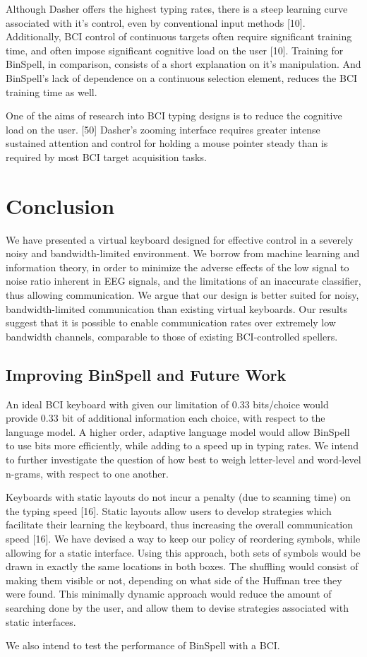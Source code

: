 \documentclass[12pt,titlepage]{article}
\begin{document}
Although Dasher offers the highest typing rates, there is a steep learning curve associated with 
it's control, even by conventional input methods [10].  Additionally, BCI control of continuous 
targets often require significant training time, and often impose significant cognitive load on 
the user [10].  Training for BinSpell, in comparison, consists of a short explanation on it's 
manipulation.  And BinSpell's lack of dependence on a continuous selection element, reduces 
the BCI training time as well.

One of the aims of research into BCI typing designs is to reduce the cognitive load on the user.
[50]  Dasher's zooming interface requires greater intense sustained attention and control for 
holding a mouse pointer steady than is required by most BCI target acquisition tasks.

\section{Conclusion}

We have presented a virtual keyboard designed for effective control in a severely noisy and
bandwidth-limited environment.  We borrow from machine learning and  information theory, in 
order to minimize the adverse effects of the low signal to noise ratio inherent in EEG signals, 
and the limitations of an inaccurate classifier, thus allowing communication.  We argue that our 
design is better suited for noisy, bandwidth-limited communication than existing virtual 
keyboards. Our results suggest that it is possible to enable communication rates over extremely 
low bandwidth channels, comparable to those of existing BCI-controlled spellers.


\subsection{Improving BinSpell and Future Work}

An ideal BCI keyboard with given our limitation of 0.33 bits/choice would provide 0.33 bit of 
additional information each choice, with respect to the language model.  A higher order, adaptive 
language model would allow BinSpell to use bits more efficiently, while adding to a speed up in typing 
rates.  We intend to further investigate the question of how best to weigh letter-level and word-level n-grams, with respect to one another. 

Keyboards with static layouts do not incur a penalty (due to scanning time) on the typing speed [16]. 
Static layouts allow users to develop strategies which facilitate their learning the keyboard, thus 
increasing the overall communication speed [16].  We have devised a way to keep our policy of 
reordering symbols, while allowing for a static interface.  Using this approach, both sets of symbols 
would be drawn in exactly the same locations in both boxes.  The  shuffling would consist of making 
them visible or not, depending on what side of the Huffman tree they were found.  This minimally 
dynamic approach would reduce the amount of searching done by the user, and allow them to devise 
strategies associated with static interfaces. 

We also intend to test the performance of BinSpell with a BCI.



\end{document}
